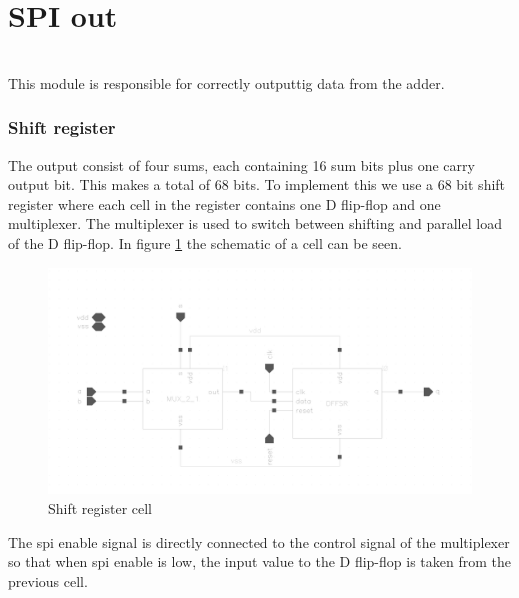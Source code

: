 
 \newpage
\section{SPI out}
\\
This module is responsible for correctly outputtig data from the adder.


\subsubsection{Shift register}
The output consist of four sums, each containing 16 sum bits plus one carry output bit. This makes a total of 68 bits. To implement this we use a 68 bit shift register where each cell in the register contains one D flip-flop and one multiplexer. The multiplexer is used to switch between shifting and parallel load of the D flip-flop. In figure \ref{mux_dff} the schematic of a cell can be seen. 

\begin{figure}[H]
\centering
\captionsetup{justification=centering}
\includegraphics[scale=0.2]{../figures/mux_dffsr.png}
\caption{Shift register cell}
\label{mux_dff}
\end{figure}

\raggedright The spi enable signal is directly connected to the control signal of the multiplexer so that when spi enable is low, the input value to the D flip-flop is taken from the previous cell. 
 


\newpage

